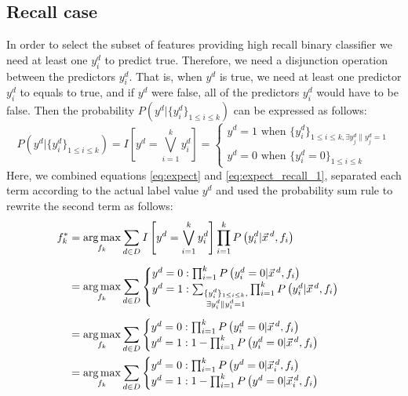 \subsection{Recall case}
In order to select the subset of features providing high recall binary classifier we need at least one $y^d_i$ to predict true. Therefore, we need a disjunction operation between the predictors $y^d_i$. That is, when $y^d$ is true, we need at least one predictor $y^d_i$ to equals to true, and if $y^d$ were false, all of the predictors $y^d_i$ would have to be false. Then the probability $P\left(y^d|\{y^d_i\}_{1\leq i\leq k}\right)$ can be expressed as follows:
\begin{equation}
P\left(y^d|\{y^d_i\}_{1\leq i\leq k}\right)=I\left[y^d=\bigvee_{i=1}^k y^d_i\right]=
\begin{cases}
	y^d=1 \text{ when } \{y_i^d\}_{1\leq i\leq k,\exists{y_j^d\|y_j^d=1}}\\
	y^d=0 \text{ when } \{y_i^d=0\}_{1\leq i\leq k}
\end{cases}\label{eq:expect_recall_1}
\end{equation}
Here, we combined equations \eqref{eq:expect} and \eqref{eq:expect_recall_1}, separated each term according to the actual label value $y^d$ and used the probability sum rule to rewrite the second term as follows:
\begin{align}
f_k^*&=\argmax_{f_k}\sum_{d\in D}I\left[y^d=\bigvee_{i=1}^k y^d_i\right]\prod_{i=1}^kP\left(y_i^d|\vec{x}^{\,d},f_i\right)\nonumber\\[0.5em]
&=\argmax_{f_k}\sum_{d\in D}
\begin{cases}
	y^d=0: \prod_{i=1}^kP\left(y_i^d=0|\vec{x}^{\,d},f_i\right)\\
	y^d=1: \sum_{\substack{\{y_i^d\}_{1\leq i\leq k},\\ \exists{y_i^d\|y_i^d=1}}}\prod_{i=1}^kP\left(y_i^d|\vec{x}^{\,d},f_i\right)
\end{cases}\nonumber\\[0.5em]
&=\argmax_{f_k}\sum_{d\in D}
\begin{cases}
	y^d=0: \prod_{i=1}^kP\left(y_i^d=0|\vec{x}^{\,d},f_i\right)\\
	y^d=1: 1-\prod_{i=1}^kP\left(y_i^d=0|\vec{x}^{\,d},f_i\right)
\end{cases}\label{eq:expect_recall_2}\\
&=\argmax_{f_k}\sum_{d\in D}
\begin{cases}
	y^d=0: \prod_{i=1}^kP\left(y^d=0|\vec{x}_i^{\,d},f_i\right)\\
	y^d=1: 1-\prod_{i=1}^kP\left(y^d=0|\vec{x}_i^{\,d},f_i\right)
\end{cases}\nonumber
\end{align}
